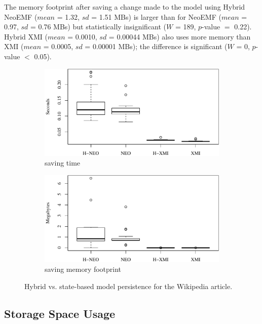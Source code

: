 \documentclass{llncs}
\begin{document}
The memory footprint after saving a change made to the model using Hybrid NeoEMF ($mean$ = 1.32, $sd$ = 1.51 MBs) is larger than for NeoEMF ($mean$ = 0.97, $sd$ = 0.76 MBs) but statistically insignificant ($W$ = 189, $p$-value $=$ 0.22). Hybrid XMI ($mean$ = 0.0010, $sd$ = 0.00044 MBs) also uses more memory than XMI ($mean$ = 0.0005, $sd$ = 0.00001 MBs); the difference is significant ($W$ = 0, $p$-value $<$ 0.05). 

\begin{figure}[ht]
    \begin{subfigure}{0.49\linewidth}
        \includegraphics[width=\linewidth]{images/save_time_wikipedia}
        \caption{saving time}
        \label{fig:save_time_wikipedia}
    \end{subfigure}
    \begin{subfigure}{0.49\linewidth}
        \includegraphics[width=\linewidth]{images/save_memory_wikipedia}
        \caption{saving memory footprint}
        \label{fig:save_memory_wikipedia}
    \end{subfigure}
\caption{Hybrid vs. state-based model persistence for the Wikipedia article.}
\end{figure}

\subsection{Storage Space Usage}
\label{sec:storage_space_usage}
\end{document}
